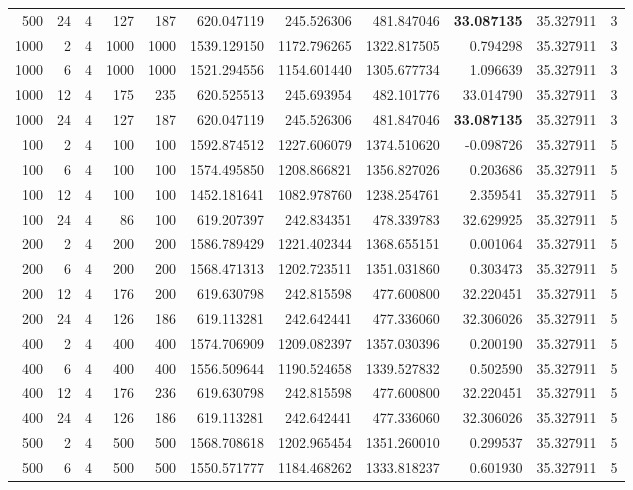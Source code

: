 \begin{table}
\begin{tabular}{rrrrrrrrrrr}
500 & 24 & 4 & 127 & 187 & 620.047119 & 245.526306 & 481.847046 & \textbf{33.087135} & 35.327911 & 3 \\
1000 & 2 & 4 & 1000 & 1000 & 1539.129150 & 1172.796265 & 1322.817505 & 0.794298 & 35.327911 & 3 \\
1000 & 6 & 4 & 1000 & 1000 & 1521.294556 & 1154.601440 & 1305.677734 & 1.096639 & 35.327911 & 3 \\
1000 & 12 & 4 & 175 & 235 & 620.525513 & 245.693954 & 482.101776 & 33.014790 & 35.327911 & 3 \\
1000 & 24 & 4 & 127 & 187 & 620.047119 & 245.526306 & 481.847046 & \textbf{33.087135} & 35.327911 & 3 \\
100 & 2 & 4 & 100 & 100 & 1592.874512 & 1227.606079 & 1374.510620 & -0.098726 & 35.327911 & 5 \\
100 & 6 & 4 & 100 & 100 & 1574.495850 & 1208.866821 & 1356.827026 & 0.203686 & 35.327911 & 5 \\
100 & 12 & 4 & 100 & 100 & 1452.181641 & 1082.978760 & 1238.254761 & 2.359541 & 35.327911 & 5 \\
100 & 24 & 4 & 86 & 100 & 619.207397 & 242.834351 & 478.339783 & 32.629925 & 35.327911 & 5 \\
200 & 2 & 4 & 200 & 200 & 1586.789429 & 1221.402344 & 1368.655151 & 0.001064 & 35.327911 & 5 \\
200 & 6 & 4 & 200 & 200 & 1568.471313 & 1202.723511 & 1351.031860 & 0.303473 & 35.327911 & 5 \\
200 & 12 & 4 & 176 & 200 & 619.630798 & 242.815598 & 477.600800 & 32.220451 & 35.327911 & 5 \\
200 & 24 & 4 & 126 & 186 & 619.113281 & 242.642441 & 477.336060 & 32.306026 & 35.327911 & 5 \\
400 & 2 & 4 & 400 & 400 & 1574.706909 & 1209.082397 & 1357.030396 & 0.200190 & 35.327911 & 5 \\
400 & 6 & 4 & 400 & 400 & 1556.509644 & 1190.524658 & 1339.527832 & 0.502590 & 35.327911 & 5 \\
400 & 12 & 4 & 176 & 236 & 619.630798 & 242.815598 & 477.600800 & 32.220451 & 35.327911 & 5 \\
400 & 24 & 4 & 126 & 186 & 619.113281 & 242.642441 & 477.336060 & 32.306026 & 35.327911 & 5 \\
500 & 2 & 4 & 500 & 500 & 1568.708618 & 1202.965454 & 1351.260010 & 0.299537 & 35.327911 & 5 \\
500 & 6 & 4 & 500 & 500 & 1550.571777 & 1184.468262 & 1333.818237 & 0.601930 & 35.327911 & 5 \\

\end{tabular}
\end{table}
